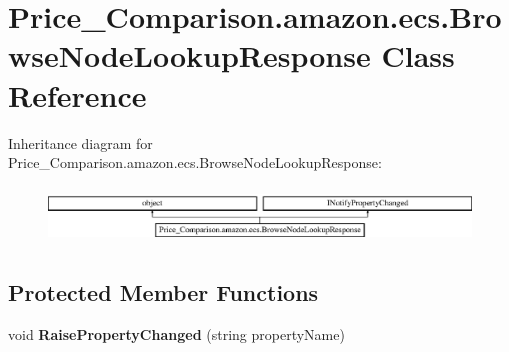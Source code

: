 \hypertarget{class_price___comparison_1_1amazon_1_1ecs_1_1_browse_node_lookup_response}{\section{Price\-\_\-\-Comparison.\-amazon.\-ecs.\-Browse\-Node\-Lookup\-Response Class Reference}
\label{class_price___comparison_1_1amazon_1_1ecs_1_1_browse_node_lookup_response}
}


 


Inheritance diagram for Price\-\_\-\-Comparison.\-amazon.\-ecs.\-Browse\-Node\-Lookup\-Response\-:\begin{figure}[H]
\begin{center}
\leavevmode
\includegraphics[height=1.525886cm]{class_price___comparison_1_1amazon_1_1ecs_1_1_browse_node_lookup_response}
\end{center}
\end{figure}
\subsection*{Protected Member Functions}
\begin{DoxyCompactItemize}
\item 
\hypertarget{class_price___comparison_1_1amazon_1_1ecs_1_1_browse_node_lookup_response_a46cdcc9dcd529b359c7bf02012c16855}{void {\bfseries Raise\-Property\-Changed} (string property\-Name)}\label{class_price___comparison_1_1amazon_1_1ecs_1_1_browse_node_lookup_response_a46cdcc9dcd529b359c7bf02012c16855}

\end{DoxyCompactItemize}
